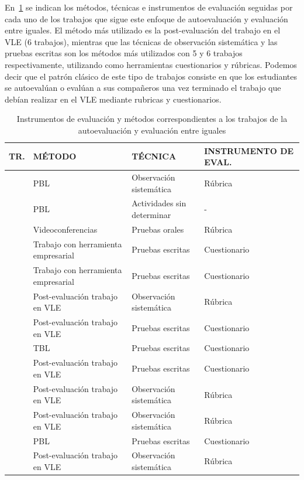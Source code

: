 En~\ref{tab:MetodosAuto} se indican los métodos, técnicas e instrumentos de evaluación seguidas por cada uno de los trabajos que sigue este enfoque de autoevaluación y evaluación entre iguales. El método más utilizado es la post-evaluación del trabajo en el VLE (6 trabajos), mientras que las técnicas de observación sistemática y las pruebas escritas son los métodos más utilizados con 5 y 6 trabajos respectivamente, utilizando como herramientas cuestionarios y rúbricas. Podemos decir que el patrón clásico de este tipo de trabajos consiste en que los estudiantes se autoevalúan o evalúan a sus compañeros una vez terminado el trabajo que debían realizar en el VLE mediante rubricas y cuestionarios. 

\begin{table}
  \begin{center}
  \begin{tabular}{| c | m{5.5cm} | m{4.5cm} | m{3cm} |}
    \hline
    TR. & MÉTODO & TÉCNICA & INSTRUMENTO DE EVAL. \\
    \hline
    \hline
    \cite{lasa2013problem} & PBL & Observación sistemática & Rúbrica \\
    \hline
    \cite{renau2010teaching} & PBL & Actividades sin determinar  & - \\
    \hline
    \cite{masip2013self} & Videoconferencias & Pruebas orales & Rúbrica \\
    \hline
    \cite{chang2009international} & Trabajo con herramienta empresarial & Pruebas escritas & Cuestionario  \\
    \hline
    \cite{achcaoucaou2014competence} & Trabajo con  herramienta empresarial & Pruebas escritas & Cuestionario  \\
    \hline
    \cite{arno2011promoting} & Post-evaluación trabajo en VLE & Observación sistemática & Rúbrica\\
    \hline
    \cite{sevilla2012assessment} &  Post-evaluación trabajo en VLE & Pruebas escritas & Cuestionario \\
    \hline
    \cite{ficapal2015learning} &  TBL & Pruebas escritas & Cuestionario \\
    \hline
    \cite{ruizacarate2013soft} &  Post-evaluación trabajo en VLE & Pruebas escritas & Cuestionario \\
    \hline
    \cite{piedra2010measuring} &  Post-evaluación trabajo en VLE & Observación sistemática & Rúbrica \\
    \hline
    \cite{carreras2013promotion} &  Post-evaluación trabajo en VLE & Observación sistemática & Rúbrica \\
    \hline
    \cite{martinez2014teamwork} & PBL & Pruebas escritas & Cuestionario \\
    \hline
    \cite{oliver2013graduate} &  Post-evaluación trabajo en VLE & Observación sistemática & Rúbrica \\
    \hline
  \end{tabular}
\end{center}
\caption{Instrumentos de evaluación y métodos correspondientes a los trabajos de la autoevaluación y evaluación entre iguales}
\label{tab:MetodosAuto}
\end{table}

